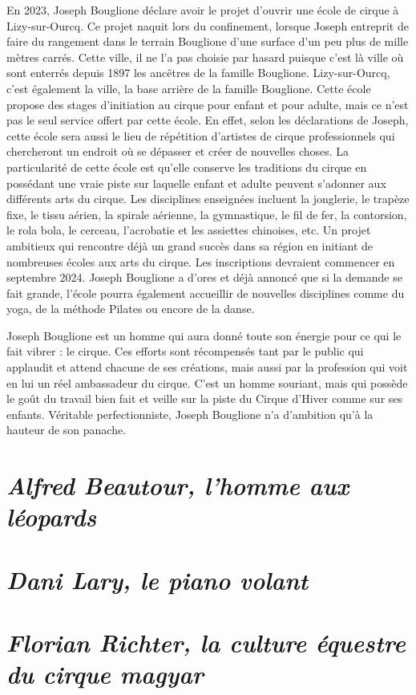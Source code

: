 En 2023, Joseph Bouglione déclare avoir le projet d'ouvrir une école de cirque à Lizy-sur-Ourcq. Ce projet naquit lors du confinement, lorsque Joseph entreprit de faire du rangement dans le terrain Bouglione d’une surface d’un peu plus de mille mètres carrés. Cette ville, il ne l’a pas choisie par hasard puisque c’est là ville où sont enterrés depuis 1897 les ancêtres de la famille Bouglione. Lizy-sur-Ourcq, c’est également la ville, la base arrière de la famille Bouglione. Cette école propose des stages d’initiation au cirque pour enfant et pour adulte, mais ce n’est pas le seul service offert par cette école. En effet, selon les déclarations de Joseph, cette école sera aussi le lieu de répétition d’artistes de cirque professionnels qui chercheront un endroit où se dépasser et créer de nouvelles choses. La particularité de cette école est qu’elle conserve les traditions du cirque en possédant une vraie piste sur laquelle enfant et adulte peuvent s’adonner aux différents arts du cirque. Les disciplines enseignées incluent la jonglerie, le trapèze fixe, le tissu aérien, la spirale aérienne, la gymnastique, le fil de fer, la contorsion, le rola bola, le cerceau, l’acrobatie et les assiettes chinoises, etc. Un projet ambitieux qui rencontre déjà un grand succès dans sa région en initiant de nombreuses écoles aux arts du cirque. Les inscriptions devraient commencer en septembre 2024. Joseph Bouglione a d’ores et déjà annoncé que si la demande se fait grande, l’école pourra également accueillir de nouvelles disciplines comme du yoga, de la méthode Pilates ou encore de la danse.

Joseph Bouglione est un homme qui aura donné toute son énergie pour ce qui le fait vibrer : le cirque. Ces efforts sont récompensés tant par le public qui applaudit et attend chacune de ses créations, mais aussi par la profession qui voit en lui un réel ambassadeur du cirque. C'est un homme souriant, mais qui possède le goût du travail bien fait et veille sur la piste du Cirque d’Hiver comme sur ses enfants. Véritable perfectionniste, Joseph Bouglione n’a d’ambition qu’à la hauteur de son panache.

\section*{\textit{Alfred Beautour, l’homme aux léopards}}
{}

\section*{\textit{Dani Lary, le piano volant}}
{}

\section*{\textit{Florian Richter, la culture équestre du cirque magyar}}
{}

\thispagestyle{empty} %

